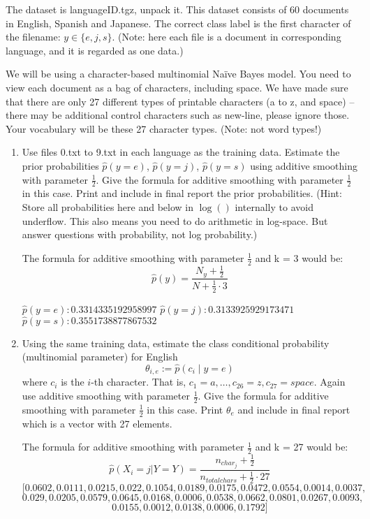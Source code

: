\documentclass[a4paper]{article}
\theoremstyle{definition}
\newenvironment{soln}{
    \leavevmode\color{blue}\ignorespaces
}{}
\begin{document}
The dataset is languageID.tgz, unpack it.
This dataset consists of 60 documents in English, Spanish and Japanese. 
The correct class label is the first character of the filename: $y \in \{e, j, s\}$. (Note: here each file is a document in corresponding language, and it is regarded as one data.)

We will be using a character-based multinomial Naïve Bayes model.  You need to view each document as a bag of characters, including space.  We have made sure that there are only 27 different types of printable characters (a to z, and space) -- there may be additional control characters such as new-line, please ignore those.  Your vocabulary will be these 27 character types. (Note: not word types!)


\begin{enumerate}
\item
Use files 0.txt to 9.txt in each language as the training data.
Estimate the prior probabilities 
$\hat p(y=e)$,
$\hat p(y=j)$,
$\hat p(y=s)$
using additive smoothing with parameter $\frac{1}{2}$. 
Give the formula for additive smoothing with parameter $\frac{1}{2}$ in this case. 
Print and include in final report the prior probabilities.
(Hint: Store all probabilities here and below in $\log()$ internally to avoid underflow. This also means you need to do arithmetic in log-space.  But answer questions with probability, not log probability.)

\begin{soln}
    The formula for additive smoothing with parameter $\frac{1}{2}$ and k = 3 would be:
        $$\hat p(y) = \frac{N_y + \frac{1}{2}}{N + \frac{1}{2} \cdot 3}$$

    $\hat p(y=e): 0.3314335192958997$
    $\hat p(y=j): 0.3133925929173471$
    $\hat p(y=s): 0.3551738877867532$
\end{soln}

\item
Using the same training data, estimate the class conditional probability (multinomial parameter) for English
$$\theta_{i,e} := \hat p(c_i \mid y=e)$$ 
where $c_i$ is the $i$-th character. That is, $c_1 = a, \ldots, c_{26} = z, c_{27} = space$.
Again use additive smoothing with parameter $\frac{1}{2}$.
Give the formula for additive smoothing with parameter $\frac{1}{2}$ in this case. 
Print $\theta_e$ and include in final report which is a vector with 27 elements.

\begin{soln}
    The formula for additive smoothing with parameter $\frac{1}{2}$ and k = 27 would be:
        $$\hat p(X_{i} = j|Y = Y) = \frac{n_{char_j} + \frac{1}{2}}{n_{totalchars} + \frac{1}{2} \cdot 27}$$
        $$ [0.0602, 0.0111, 0.0215, 0.022, 0.1054, 0.0189, 0.0175, 0.0472, 0.0554, 0.0014, 0.0037, $$
        $$ 0.029, 0.0205, 0.0579, 0.0645, 0.0168, 0.0006, 0.0538, 0.0662, 0.0801, 0.0267, 0.0093,  $$
        $$0.0155, 0.0012, 0.0138, 0.0006, 0.1792]$$
\end{soln}



\end{enumerate}
\end{document}
